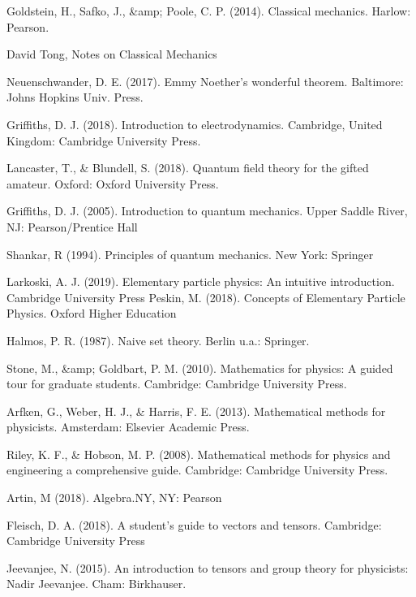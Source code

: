\documentclass[a4paper,oneside,11pt, numbers=noenddot]{scrreprt}%
\begin{document}



\begin{thebibliography}{9}
    \bibitem {} Goldstein, H., Safko, J., &amp; Poole, C. P. (2014). Classical mechanics. Harlow: Pearson.
    
    \bibitem {} David Tong, Notes on Classical Mechanics
    	
	 Neuenschwander, D. E. (2017). Emmy Noether's wonderful theorem. Baltimore: Johns Hopkins Univ. Press.
	
	 Griffiths, D. J. (2018). Introduction to electrodynamics. Cambridge, United Kingdom: Cambridge University Press.
	
	 Lancaster, T., \& Blundell, S. (2018). Quantum field theory for the gifted amateur. Oxford: Oxford University Press.
	
	 Griffiths, D. J. (2005). Introduction to quantum mechanics. Upper Saddle River, NJ: Pearson/Prentice Hall 
	
	 Shankar, R (1994). Principles of quantum mechanics. New York: Springer
	
	 Larkoski, A. J. (2019). Elementary particle physics: An intuitive introduction. Cambridge University Press 
	 Peskin, M. (2018). Concepts of Elementary Particle Physics. Oxford Higher Education 
	
	\bibitem {} Halmos, P. R. (1987). Naive set theory. Berlin u.a.: Springer.
	
	\bibitem {} Stone, M., &amp; Goldbart, P. M. (2010). Mathematics for physics: A guided tour for graduate students. Cambridge: Cambridge University Press.
	
	  Arfken, G., Weber, H. J., \& Harris, F. E. (2013). Mathematical methods for physicists. Amsterdam: Elsevier Academic Press.
	
	 Riley, K. F., \& Hobson, M. P. (2008). Mathematical methods for physics and engineering a comprehensive guide. Cambridge: Cambridge University Press.
	
	 Artin, M (2018). Algebra.NY, NY: Pearson
	
	 Fleisch, D. A. (2018). A student's guide to vectors and tensors. Cambridge: Cambridge University Press
	
	 Jeevanjee, N. (2015). An introduction to tensors and group theory for physicists: Nadir Jeevanjee. Cham: Birkhauser.
	

\end{thebibliography}
\end{document}
